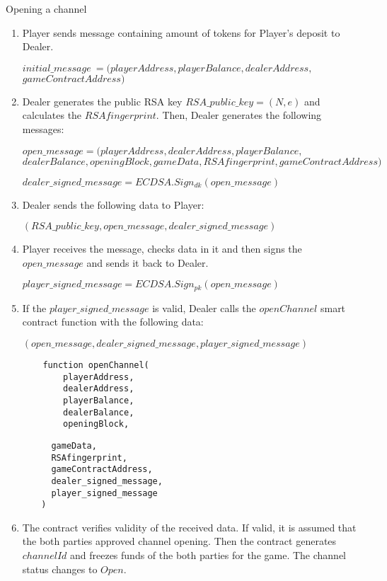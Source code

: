 \begin{algorithm}
\caption{Opening a channel} \label{alg:openchannel}
\begin{enumerate}
	\item Player sends message containing amount of tokens for Player's deposit to Dealer.
\begin{center}
	 $initial\_message\ = (playerAddress, playerBalance, dealerAddress,$\\$ gameContractAddress)$
\end{center}
	\item Dealer generates the public RSA key $RSA\_public\_key= (N,e)$ and calculates the $RSAfingerprint$. Then, Dealer generates the following messages:
\begin{center}
	 $open\_message = (playerAddress,  dealerAddress, playerBalance, $\\$dealerBalance, openingBlock, gameData, RSAfingerprint, gameContractAddress)$

	$dealer\_signed\_message = ECDSA.Sign_{dk}(open\_message)$
\end{center}
	\item Dealer sends the following data to Player:
\begin{center}
$(RSA\_public\_key, open\_message,dealer\_signed\_message)$
\end{center}
	\item Player receives the message, checks data in it and then signs the $open\_message$ and sends it back to Dealer.
\begin{center}
	$player\_signed\_message = ECDSA.Sign_{pk}(open\_message)$
\end{center}
\item If the $player\_signed\_message$ is valid, Dealer calls the $openChannel$ smart contract function with the following data:
\begin{center}
$(open\_message,dealer\_signed\_message,player\_signed\_message)$
\end{center}	
\begin{lstlisting}
    function openChannel(
        playerAddress,
        dealerAddress,
        playerBalance,
        dealerBalance,
        openingBlock,
\end{lstlisting}
\end{enumerate}
\end{algorithm}
\begin{algorithm}
\begin{lstlisting}
	     gameData,
	     RSAfingerprint,
	     gameContractAddress,
	     dealer_signed_message,
	     player_signed_message
 	   )
\end{lstlisting}
\begin{enumerate}
\setcounter{enumi}{5}
\item The contract verifies validity of the received data. If valid, it is assumed that the both parties approved channel opening. Then the contract generates $channelId$ and freezes funds of the both parties for the game. The channel status changes to $Open$. 
\end{enumerate}
\end{algorithm}

